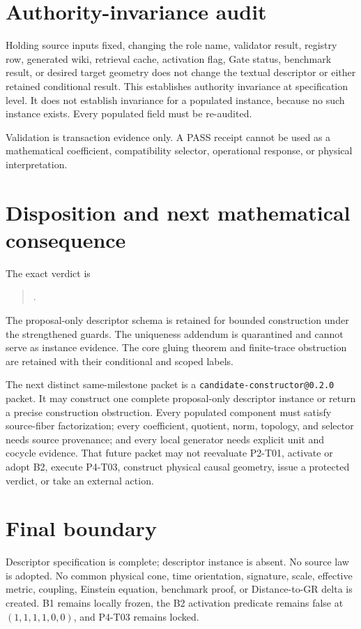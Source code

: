 \documentclass[11pt]{article}
\begin{document}
\section{Authority-invariance audit}

Holding source inputs fixed, changing the role name, validator result,
registry row, generated wiki, retrieval cache, activation flag, Gate status,
benchmark result, or desired target geometry does not change the textual
descriptor or either retained conditional result.  This establishes
authority invariance at specification level.  It does not establish invariance
for a populated instance, because no such instance exists.  Every populated
field must be re-audited.

Validation is transaction evidence only.  A PASS receipt cannot be used as a
mathematical coefficient, compatibility selector, operational response, or
physical interpretation.

\section{Disposition and next mathematical consequence}

The exact verdict is
\begin{quote}\footnotesize\sloppy
{}.
\end{quote}

The proposal-only descriptor schema is retained for bounded construction under
the strengthened guards.  The uniqueness addendum is quarantined and cannot
serve as instance evidence.  The core gluing theorem and finite-trace
obstruction are retained with their conditional and scoped labels.

The next distinct same-milestone packet is a
\texttt{candidate-constructor@0.2.0} packet.  It may construct one complete
proposal-only descriptor instance or return a precise construction
obstruction.  Every populated component must satisfy source-fiber
factorization; every coefficient, quotient, norm, topology, and selector needs
source provenance; and every local generator needs explicit unit and cocycle
evidence.  That future packet may not reevaluate P2-T01, activate or adopt B2,
execute P4-T03, construct physical causal geometry, issue a protected verdict,
or take an external action.

\section{Final boundary}

Descriptor specification is complete; descriptor instance is absent.
No source law is adopted.  No common physical cone, time orientation,
signature, scale, effective metric, coupling, Einstein equation, benchmark
proof, or Distance-to-GR delta is created.  B1 remains locally frozen, the B2
activation predicate remains false at $(1,1,1,1,0,0)$, and P4-T03 remains
locked.
\end{document}
